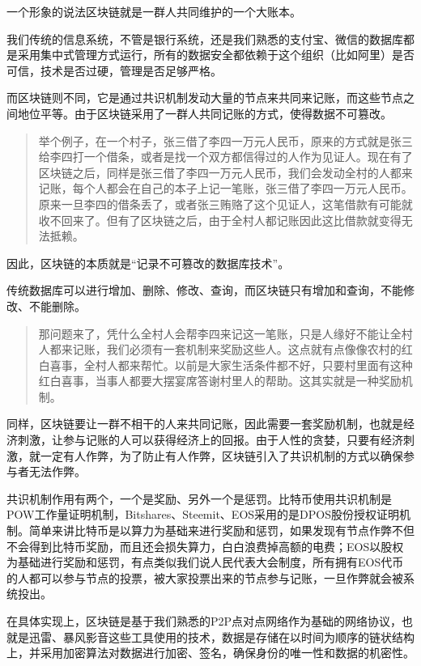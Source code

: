 \documentclass[]{ctexbook}
\begin{document}
一个形象的说法区块链就是一群人共同维护的一个大账本。

我们传统的信息系统，不管是银行系统，还是我们熟悉的支付宝、微信的数据库都是采用集中式管理方式运行，所有的数据安全都依赖于这个组织（比如阿里）是否可信，技术是否过硬，管理是否足够严格。

而区块链则不同，它是通过共识机制发动大量的节点来共同来记账，而这些节点之间地位平等。由于区块链采用了一群人共同记账的方式，使得数据不可篡改。

\begin{quote}
举个例子，在一个村子，张三借了李四一万元人民币，原来的方式就是张三给李四打一个借条，或者是找一个双方都信得过的人作为见证人。现在有了区块链之后，同样是张三借了李四一万元人民币，我们会发动全村的人都来记账，每个人都会在自己的本子上记一笔账，张三借了李四一万元人民币。原来一旦李四的借条丢了，或者张三贿赂了这个见证人，这笔借款有可能就收不回来了。但有了区块链之后，由于全村人都记账因此这比借款就变得无法抵赖。
\end{quote}

因此，区块链的本质就是``记录不可篡改的数据库技术''。

传统数据库可以进行增加、删除、修改、查询，而区块链只有增加和查询，不能修改、不能删除。

\begin{quote}
那问题来了，凭什么全村人会帮李四来记这一笔账，只是人缘好不能让全村人都来记账，我们必须有一套机制来奖励这些人。这点就有点像像农村的红白喜事，全村人都来帮忙。以前是大家生活条件都不好，只要村里面有这种红白喜事，当事人都要大摆宴席答谢村里人的帮助。这其实就是一种奖励机制。
\end{quote}

同样，区块链要让一群不相干的人来共同记账，因此需要一套奖励机制，也就是经济刺激，让参与记账的人可以获得经济上的回报。由于人性的贪婪，只要有经济刺激，就一定有人作弊，为了防止有人作弊，区块链引入了共识机制的方式以确保参与者无法作弊。

共识机制作用有两个，一个是奖励、另外一个是惩罚。比特币使用共识机制是POW工作量证明机制，Bitshares、Steemit、EOS采用的是DPOS股份授权证明机制。简单来讲比特币是以算力为基础来进行奖励和惩罚，如果发现有节点作弊不但不会得到比特币奖励，而且还会损失算力，白白浪费掉高额的电费；EOS以股权为基础进行奖励和惩罚，有点类似我们说人民代表大会制度，所有拥有EOS代币的人都可以参与节点的投票，被大家投票出来的节点参与记账，一旦作弊就会被系统投出。

在具体实现上，区块链是基于我们熟悉的P2P点对点网络作为基础的网络协议，也就是迅雷、暴风影音这些工具使用的技术，数据是存储在以时间为顺序的链状结构上，并采用加密算法对数据进行加密、签名，确保身份的唯一性和数据的机密性。
\end{document}
